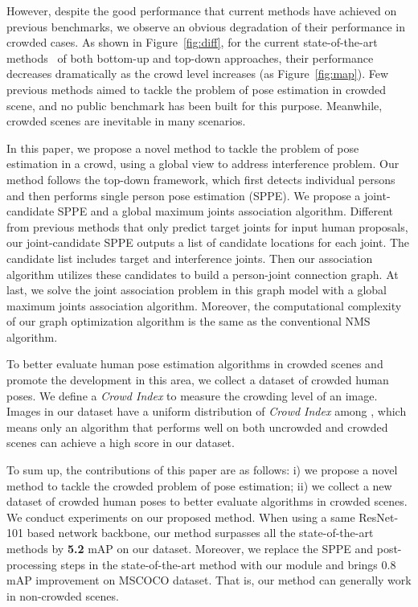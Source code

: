 \documentclass[10pt,twocolumn,letterpaper]{article}
\begin{document}
However, despite the good performance that current methods have achieved on previous benchmarks, we observe an obvious degradation of their performance in crowded cases. As shown in Figure~\ref{fig:diff}, for the current state-of-the-art methods~\cite{msra, alphapose, maskrcnn, cao} of both bottom-up and top-down approaches, their performance decreases dramatically as the crowd level increases (as Figure~\ref{fig:map}). Few previous methods aimed to tackle the problem of pose estimation in crowded scene, and no public benchmark has been built for this purpose. Meanwhile, crowded scenes are inevitable in many scenarios.

In this paper, we propose a novel method to tackle the problem of pose estimation in a crowd, using a global view to address interference problem. Our method follows the top-down framework, which first detects individual persons and then performs single person pose estimation (SPPE). We propose a joint-candidate SPPE and a global maximum joints association algorithm. Different from previous methods that only predict target joints for input human proposals, our joint-candidate SPPE outputs a list of candidate locations for each joint. The candidate list includes target and interference joints. Then our association algorithm utilizes these candidates to build a person-joint connection graph. At last, we solve the joint association problem in this graph model with a global maximum joints association algorithm. Moreover, the computational complexity of our graph optimization algorithm is the same as the conventional NMS algorithm. 

To better evaluate human pose estimation algorithms in crowded scenes and promote the development in this area, we collect a dataset of crowded human poses. We define a \textit{Crowd Index} to measure the crowding level of an image. Images in our dataset have a uniform distribution of \textit{Crowd Index} among , which means only an algorithm that performs well on both uncrowded and crowded scenes can achieve a high score in our dataset.

To sum up, the contributions of this paper are as follows: i) we propose a novel method to tackle the crowded problem of pose estimation; ii) we collect a new dataset of crowded human poses to better evaluate algorithms in crowded scenes. 
We conduct experiments on our proposed method. When using a same ResNet-101 based network backbone, our method surpasses all the state-of-the-art methods by \textbf{5.2} mAP on our dataset. Moreover, we replace the SPPE and post-processing steps in the state-of-the-art method with our module and brings 0.8 mAP improvement on MSCOCO dataset. That is, our method can generally work in non-crowded scenes.  
\end{document}
